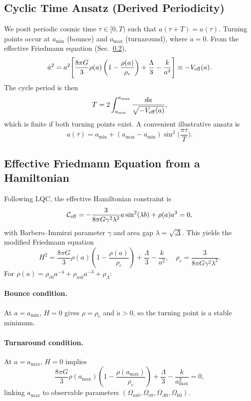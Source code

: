 \documentclass[12pt]{article}
\begin{document}
\subsection{Cyclic Time Ansatz (Derived Periodicity)}
We posit periodic cosmic time $\tau \in [0,T)$ such that $a(\tau+T)=a(\tau)$. Turning points
occur at $a_{\min}$ (bounce) and $a_{\max}$ (turnaround), where $\dot a=0$.
From the effective Friedmann equation (Sec.~\ref{sec:effFriedmann}),
\begin{equation}
\dot a^2 = a^2\Bigg[\frac{8\pi G}{3}\rho(a)\left(1-\frac{\rho(a)}{\rho_c}\right)+\frac{\Lambda}{3}-\frac{k}{a^2}\Bigg]
\equiv -V_{\rm eff}(a).
\end{equation}
The cycle period is then
\begin{equation}
T = 2\int_{a_{\min}}^{a_{\max}}\frac{da}{\sqrt{-V_{\rm eff}(a)}},
\end{equation}
which is finite if both turning points exist. A convenient illustrative ansatz is
\begin{equation}
a(\tau) = a_{\min}+(a_{\max}-a_{\min})\sin^2\!\Big(\frac{\pi \tau}{T}\Big).
\end{equation}

\subsection{Effective Friedmann Equation from a Hamiltonian}
\label{sec:effFriedmann}
Following LQC, the effective Hamiltonian constraint is
\begin{equation}
\mathcal{C}_{\rm eff}=-\frac{3}{8\pi G\gamma^2\lambda^2}a\sin^2(\lambda b)+\rho(a)a^3=0,
\end{equation}
with Barbero--Immirzi parameter $\gamma$ and area gap $\lambda=\sqrt{\Delta}$.
This yields the modified Friedmann equation
\begin{equation}
H^2=\frac{8\pi G}{3}\rho(a)\left(1-\frac{\rho(a)}{\rho_c}\right)+\frac{\Lambda}{3}-\frac{k}{a^2},
\quad \rho_c=\frac{3}{8\pi G\gamma^2\lambda^2}.
\end{equation}
For $\rho(a)=\rho_{r0}a^{-4}+\rho_{m0}a^{-3}+\rho_\Lambda$:

\paragraph{Bounce condition.} At $a=a_{\min}$, $H=0$ gives $\rho=\rho_c$ and $\ddot a>0$, 
so the turning point is a stable minimum.

\paragraph{Turnaround condition.} At $a=a_{\max}$, $H=0$ implies
\begin{equation}
\frac{8\pi G}{3}\rho(a_{\max})\left(1-\frac{\rho(a_{\max})}{\rho_c}\right)+\frac{\Lambda}{3}-\frac{k}{a_{\max}^2}=0,
\end{equation}
linking $a_{\max}$ to observable parameters $(\Omega_{m0},\Omega_{r0},\Omega_{\Lambda0},\Omega_{k0})$.
\end{document}
